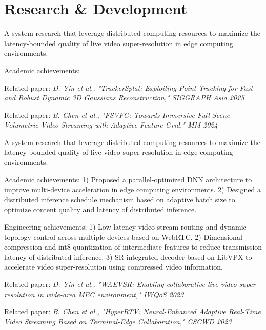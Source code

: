 \documentclass[]{deedy-resume-openfont}
\begin{document}
\hfill
\begin{minipage}[t]{0.77\textwidth} 


\section{Research \& Development}
\vspace{\topsep}
\begin{tightemize}
    \item A system research that leverage distributed computing resources to maximize the latency-bounded quality of live video super-resolution in edge computing environments.
    \item Academic achievements: 
    \item Related paper: \textit{D. Yin et al., "TrackerSplat: Exploiting Point Tracking for Fast and Robust Dynamic 3D Gaussians Reconstruction," SIGGRAPH Asia 2025}
    \item Related paper: \textit{B. Chen et al., "FSVFG: Towards Immersive Full-Scene Volumetric Video Streaming with Adaptive Feature Grid," MM 2024}
\end{tightemize}
\vspace{\topsep}
\begin{tightemize}
    \item A system research that leverage distributed computing resources to maximize the latency-bounded quality of live video super-resolution in edge computing environments.
    \item Academic achievements: 
    1) Proposed a parallel-optimized DNN architecture to improve multi-device acceleration in edge computing environments. %
    2) Designed a distributed inference schedule mechanism based on adaptive batch size to optimize content quality and latency of distributed inference.
    \item Engineering achievements: 
    1) Low-latency video stream routing and dynamic topology control across multiple devices based on WebRTC.
    2) Dimensional compression and int8 quantization of intermediate features to reduce transmission latency of distributed inference. %
    3) SR-integrated decoder based on LibVPX to accelerate video super-resolution using compressed video information.
    \item Related paper: \textit{D. Yin et al., "WAEVSR: Enabling collaborative live video super-resolution in wide-area MEC environment," IWQoS 2023}
    \item Related paper: \textit{B. Chen et al., "HyperRTV: Neural-Enhanced Adaptive Real-Time Video Streaming Based on Terminal-Edge Collaboration," CSCWD 2023}
\end{tightemize}
\sectionsep



\end{minipage}
\end{document}
